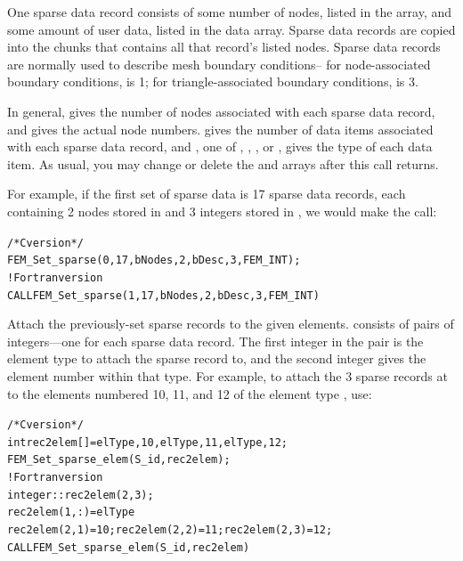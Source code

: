 One sparse data record consists of some number of nodes, listed in the
 array, and some amount of user data, listed in the data array.
Sparse data records are copied into the chunks that contains all that record's listed 
nodes.  Sparse data records are normally used to describe mesh boundary conditions--
for node-associated boundary conditions,  is 1; for triangle-associated
boundary conditions,  is 3.

In general,  gives the number of nodes associated with each
sparse data record, and  gives the actual node numbers.
 gives the number of data items associated with each sparse 
data record, and , one of , ,
, or , gives the type of each data item.
As usual, you may change or delete the  and  arrays after this
call returns.

For example, if the first set of sparse data is 17 sparse data records, each 
containing 2 nodes stored in  and 3 integers stored in , 
we would make the call:
\begin{alltt}
/*C version*/
  FEM_Set_sparse(0,17, bNodes,2, bDesc,3,FEM_INT);
! Fortran version
  CALL FEM_Set_sparse(1,17, bNodes,2, bDesc,3,FEM_INT)
\end{alltt}


Attach the previously-set sparse records  to the given elements.
 consists of pairs of integers---one for each sparse data record.
The first integer in the pair is the
element type to attach the sparse record to, and the second integer
gives the element number within that type.  For example, to attach
the 3 sparse records at  to the elements numbered 10, 11, and 12
of the element type , use:

\begin{alltt}
/*C version*/
  int rec2elem[]={elType,10, elType,11, elType,12};
  FEM_Set_sparse_elem(S_id,rec2elem);
! Fortran version
  integer :: rec2elem(2,3);
  rec2elem(1,:)=elType
  rec2elem(2,1)=10; rec2elem(2,2)=11; rec2elem(2,3)=12;
  CALL FEM_Set_sparse_elem(S_id,rec2elem)
\end{alltt}


